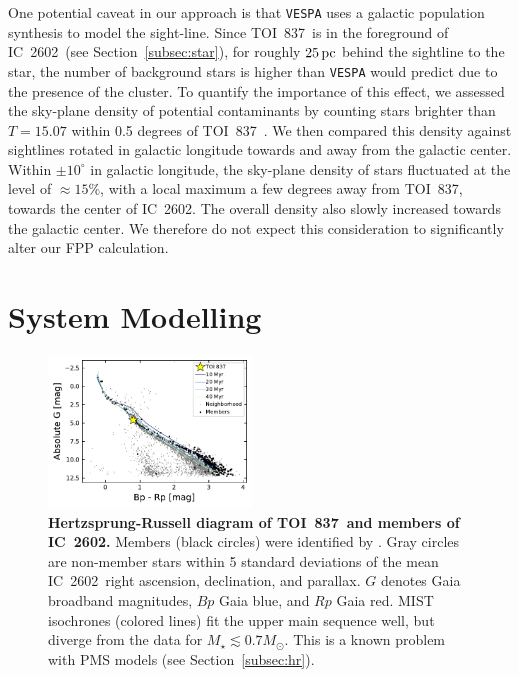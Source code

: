 \documentclass[12pt,twocolumn,tighten]{aastex63}
\newcommand{\tn}{TOI~837} %
\newcommand{\cn}{IC~2602} %
\begin{document}
One potential caveat in our approach is that \texttt{VESPA} uses a galactic
population synthesis to model the sight-line. Since \tn\ is in the
foreground of \cn\ (see Section~\ref{subsec:star}), for roughly
$25\,{\rm pc}$ behind the sightline to the star, the number of
background stars is higher than \texttt{VESPA} would predict due to the
presence of the cluster.  To quantify the importance of this effect,
we assessed the sky-plane density of potential contaminants by
counting stars brighter than $T=15.07$ within 0.5 degrees of \tn\
\citep{stassun_TIC8_2019}. We then compared this density against
sightlines rotated in galactic longitude towards and away from the
galactic center. Within $\pm10^\circ$ in galactic longitude, the
sky-plane density of stars fluctuated at the level of $\approx 15\%$,
with a local maximum a few degrees away from \tn, towards the center of \cn.
The overall density also slowly increased towards the galactic center.
We therefore do not expect this consideration to significantly alter
our FPP calculation.


\section{System Modelling}
\label{sec:system}

\begin{figure}[!t]
	\begin{center}
		\leavevmode
		\includegraphics[width=0.48\textwidth]{f7.pdf}
	\end{center}
	\vspace{-0.7cm}
	\caption{ 
  {\bf Hertzsprung-Russell diagram of \tn\ and members of \cn.}
  Members (black circles) were identified by
  \citet{cantatgaudin_gaia_2018}.  Gray circles are non-member stars
  within 5 standard deviations of the mean \cn\ right ascension,
  declination, and parallax.  $G$ denotes Gaia broadband magnitudes,
  $Bp$ Gaia blue, and $Rp$ Gaia red.  MIST isochrones (colored lines)
  fit the upper main sequence well, but diverge from the data for
  $M_\star \lesssim 0.7 M_\odot$. This is a known problem with PMS
  models (see Section~\ref{subsec:hr}).
  \label{fig:hr}
	}
\end{figure}
\end{document}
